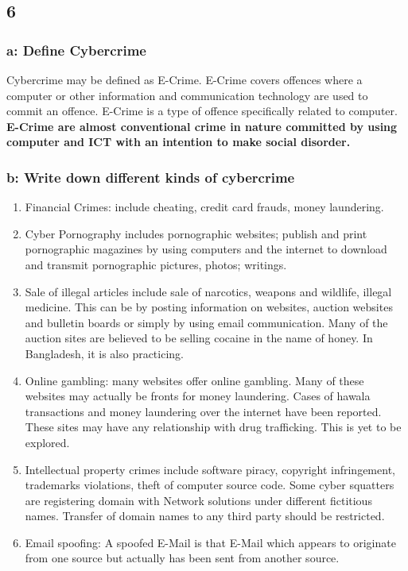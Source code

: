 \documentclass[14 pt, letterpaper]{extarticle}
\begin{document}
\begin{justify}
	\subsection*{6}
	\subsubsection*{a: Define Cybercrime}
		Cybercrime may be defined as E-Crime. E-Crime covers offences where a computer or other information and communication technology are used to commit an offence. E-Crime is a type of offence specifically related to computer. \textbf{E-Crime are almost conventional crime in nature committed by using computer and ICT with an intention to make social disorder.}
	\subsubsection*{b: Write down different kinds of cybercrime}
		\begin{enumerate}
			\item Financial Crimes: include cheating, credit card frauds, money laundering.
			\item Cyber Pornography includes pornographic websites; publish and print pornographic magazines by using computers and the internet to download and transmit pornographic pictures, photos; writings.
			\item Sale of illegal articles include sale of narcotics, weapons and wildlife, illegal medicine. This can be by posting information on websites, auction websites and bulletin boards or simply by using email communication. Many of the auction sites are believed to be selling cocaine in the name of honey. In Bangladesh, it is also practicing.
			\item Online gambling: many websites offer online gambling. Many of these websites may actually be fronts for money laundering. Cases of hawala transactions and money laundering over the internet have been reported. These sites may have any relationship with drug trafficking. This is yet to be explored.
			\item Intellectual property crimes include software piracy, copyright infringement, trademarks violations, theft of computer source code. Some cyber squatters are registering domain with Network solutions under different fictitious names. Transfer of domain names to any third party should be restricted.
			\item Email spoofing: A spoofed E-Mail is that E-Mail which appears to originate from one source but actually has been sent from another source.

\end{enumerate}
\end{justify}
\end{document}
